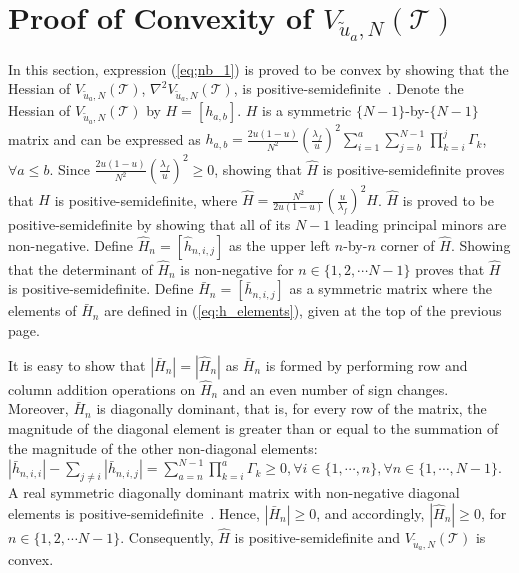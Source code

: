 \documentclass[11pt,draftclsnofoot,journal,onecolumn]{IEEEtran}
\begin{document}
\section{Proof of Convexity of $V_{\tilde{u}_a,N}\left( \mathcal{T} \right)$}
\label{sec:V_u_conv}

\begin{IEEEproof}
In this section, expression (\ref{eq;nb_1}) is proved to be convex by showing that the Hessian of $V_{\tilde{u}_a,N}\left( \mathcal{T} \right)$, $\nabla^2 V_{\tilde{u}_a,N}\left( \mathcal{T} \right)$, is positive-semidefinite~\cite{berghe}. Denote the Hessian of $V_{\tilde{u}_a,N}\left( \mathcal{T} \right)$ by $H = [h_{a,b}]$. $H$ is a symmetric $\{N-1\}$-by-$\{N-1\}$ matrix and can be expressed as $h_{a,b} = \frac{2u(1-u)}{N^2} \left(\frac{\lambda_f}{u}\right)^2 \sum_{i=1}^{a} \sum_{j=b}^{N-1} \prod_{k=i}^{j} \Gamma_k$, $\forall a \leq b$. Since $\frac{2u(1-u)}{N^2} \left(\frac{\lambda_f}{u}\right)^2 \geq 0$, showing that $\hat{H}$ is positive-semidefinite proves that $H$ is positive-semidefinite, where $\hat{H} = \frac{N^2}{2u(1-u)} \left(\frac{u}{\lambda_f}\right)^2 H$. $\hat{H}$ is proved to be positive-semidefinite by showing that all of its $N-1$ leading principal minors are non-negative. Define $\hat{H}_n = [\hat{h}_{n,i,j}]$ as the upper left $n$-by-$n$ corner of $\hat{H}$. Showing that the determinant of $\hat{H}_n$ is non-negative for $n \in \{1,2,\cdots N-1\}$ proves that $\hat{H}$ is positive-semidefinite. Define $\bar{H}_n = [\bar{h}_{n,i,j}]$ as a symmetric matrix where the elements of $\bar{H}_n$ are defined in (\ref{eq:h_elements}), given at the top of the previous page. 

It is easy to show that $|\bar{H}_n| = |\hat{H}_n|$ as $\bar{H}_n$ is formed by performing row and column addition operations on $\hat{H}_n$ and an even number of sign changes. Moreover, $\bar{H}_n$ is diagonally dominant, that is, for every row of the matrix, the magnitude of the diagonal element is greater than or equal to the summation of the magnitude of the other non-diagonal elements: $|\bar{h}_{n,i,i}| - \sum_{j \neq i} |\bar{h}_{n,i,j}| = \sum_{a=n}^{N-1} \prod_{k=i}^{a} \Gamma_k \geq 0 , \forall i \in \{1,\cdots,n\}, \forall n \in \{1,\cdots,N-1\}$. A real symmetric diagonally dominant matrix with non-negative diagonal elements is positive-semidefinite~\cite[Ch. 6]{matrix_book}. Hence, $|\bar{H}_n| \geq 0$, and accordingly, $|\hat{H}_n| \geq 0$, for $n \in \{1,2,\cdots N-1\}$. Consequently, $\hat{H}$ is positive-semidefinite and $V_{\tilde{u}_a,N}\left( \mathcal{T} \right)$ is convex.
\end{IEEEproof}
\end{document}
